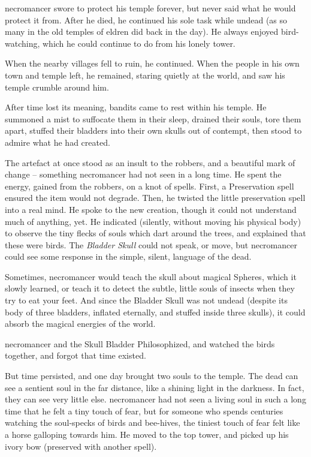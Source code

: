 
\begin{exampletext}
  \noindent
  \Gls{necromancer} swore to protect his temple forever, but never said what he would protect it from.
  After he died, he continued his sole task while undead (as so many in the old temples of \gls{eldren} did back in the day).
  He always enjoyed bird-watching, which he could continue to do from his lonely tower.

  When the nearby \glspl{village} fell to ruin, he continued.
  When the people in his own town and temple left, he remained, staring quietly at the world, and saw his temple crumble around him.

  After time lost its meaning, bandits came to rest within his temple.
  He summoned a mist to suffocate them in their sleep, drained their souls, tore them apart, stuffed their bladders into their own skulls out of contempt, then stood to admire what he had created.

  The \gls{artefact} at once stood as an insult to the robbers, and a beautiful mark of change -- something \gls{necromancer} had not seen in a long time.
  He spent the energy, gained from the robbers, on a knot of spells.
  First, a Preservation spell ensured the item would not degrade.
  Then, he twisted the little preservation spell into a real mind.
  He spoke to the new creation, though it could not understand much of anything, yet.
  He indicated (silently, without moving his physical body) to observe the tiny flecks of souls which dart around the trees, and explained that these were birds.
  The \textit{Bladder Skull} could not speak, or move, but \gls{necromancer} could see some response in the simple, silent, language of the dead.

  Sometimes, \gls{necromancer} would teach the skull about magical Spheres, which it slowly learned, or teach it to detect the subtle, little souls of insects when they try to eat your feet.
  And since the Bladder Skull was not undead (despite its body of three bladders, inflated eternally, and stuffed inside three skulls), it could absorb the magical energies of the world.

  \Gls{necromancer} and the Skull Bladder Philosophized, and watched the birds together, and forgot that time existed.

  But time persisted, and one day brought two souls to the temple.
  The dead can see a sentient soul in the far distance, like a shining light in the darkness.
  In fact, they can see very little else.
  \Gls{necromancer} had not seen a living soul in such a long time that he felt a tiny touch of fear, but for someone who spends centuries watching the soul-specks of birds and bee-hives, the tiniest touch of fear felt like a horse galloping towards him.
  He moved to the top tower, and picked up his ivory bow (preserved with another spell).


\end{exampletext}
